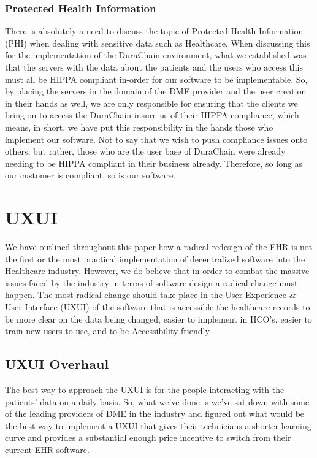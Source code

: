 \documentclass[12pt]{article}
\begin{document}
  \subsubsection{Protected Health Information}
  There is absolutely a need to discuss the topic of Protected Health Information (PHI) when dealing with sensitive data such as Healthcare. When discussing this for the implementation of the DuraChain environment, what we established was that the servers with the data about the patients and the users who access this must all be HIPPA compliant in-order for our software to be implementable. So, by placing the servers in the domain of the DME provider and the user creation in their hands as well, we are only responsible for ensuring that the clients we bring on to access the DuraChain insure us of their HIPPA compliance, which means, in short, we have put this responsibility in the hands those who implement our software. Not to say that we wish to push compliance issues onto others, but rather, those who are the user base of DuraChain were already needing to be HIPPA compliant in their business already. Therefore, so long as our customer is compliant, so is our software.

\section{UXUI}
We have outlined throughout this paper how a radical redesign of the EHR is not the first or the most practical implementation of decentralized software into the Healthcare industry. However, we do believe that in-order to combat the massive issues faced by the industry in-terms of software design a radical change must happen. The most radical change should take place in the User Experience & User Interface (UXUI) of the software that is accessible the healthcare records to be more clear on the data being changed, easier to implement in HCO’s, easier to train new users to use, and to be Accessibility friendly.

  \subsection{UXUI Overhaul}
  The best way to approach the UXUI is for the people interacting with the patients' data on a daily basis. So, what we’ve done is we’ve sat down with some of the leading providers of DME in the industry and figured out what would be the best way to implement a UXUI that gives their technicians a shorter learning curve and provides a substantial enough price incentive to switch from their current EHR software.
\end{document}
